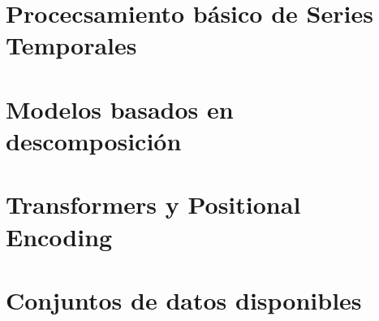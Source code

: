 \section{Procecsamiento básico de Series Temporales}



\section{Modelos basados en descomposición}

\section{Transformers y Positional Encoding}

\section{Conjuntos de datos disponibles}
